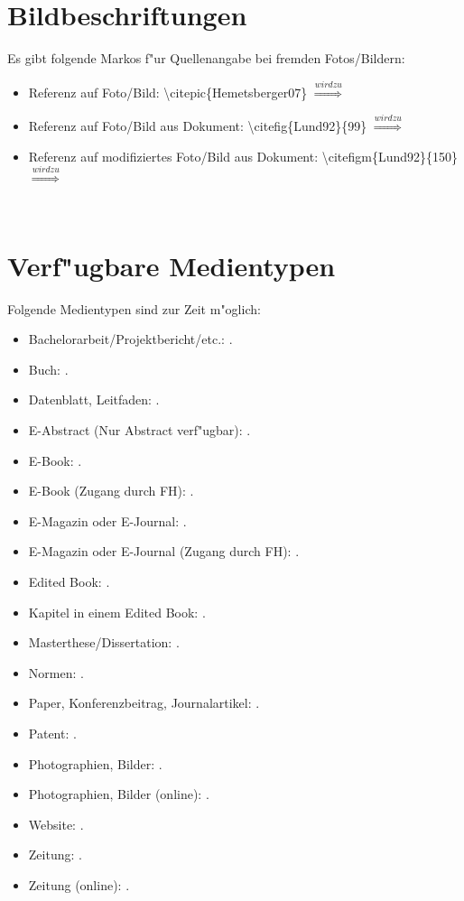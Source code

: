 \documentclass[a4paper,bibtotoc,oneside]{scrbook}
\begin{document}
\section{Bildbeschriftungen}

Es gibt folgende Markos f"ur Quellenangabe bei fremden Fotos/Bildern:

\begin{itemize}
\item Referenz auf Foto/Bild: \textbackslash citepic\{Hemetsberger07\} $\overset{wird zu}{\Longrightarrow}$ 
\item Referenz auf Foto/Bild aus Dokument: \textbackslash citefig\{Lund92\}\{99\} $\overset{wird zu}{\Longrightarrow}$ 
\item Referenz auf modifiziertes Foto/Bild aus Dokument: \textbackslash citefigm\{Lund92\}\{150\} $\overset{wird zu}{\Longrightarrow}$ 
\end{itemize}\ \\

\section{Verf"ugbare Medientypen}
Folgende Medientypen sind zur Zeit m"oglich:

\begin{itemize}
\item Bachelorarbeit/Projektbericht/etc.: \cite{Baldinger10,Piringer11}.
\item Buch: \cite{Aangerman09a,Aangerman09b}.
\item Datenblatt, Leitfaden: \cite{Anglia10,Atmel11}.
\item E-Abstract (Nur Abstract verf"ugbar): \cite{Astrom01}.
\item E-Book: \cite{Kastner11}.
\item E-Book (Zugang durch FH): \cite{Kessler11}.
\item E-Magazin oder E-Journal: \cite{Lund92,Zinner07}.
\item E-Magazin oder E-Journal (Zugang durch FH): \cite{Bach82}.
\item Edited Book: \cite{Braun07,Braun10}.
\item Kapitel in einem Edited Book: \cite{Samson70,Smith75}.
\item Masterthese/Dissertation: \cite{Pohn10,Humenberger11}.
\item Normen: \cite{ISO98}.
\item Paper, Konferenzbeitrag, Journalartikel: \cite{Zettler98,Gesztesy00}.
\item Patent: \cite{Anderson10}.
\item Photographien, Bilder: \cite{Hemetsberger07}.
\item Photographien, Bilder (online): \cite{Dean08}.
\item Website: \cite{Technikum11}.
\item Zeitung: \cite{Slapper05}.
\item Zeitung (online): \cite{Chittenden03}.
\end{itemize}



\newpage
\end{document}
